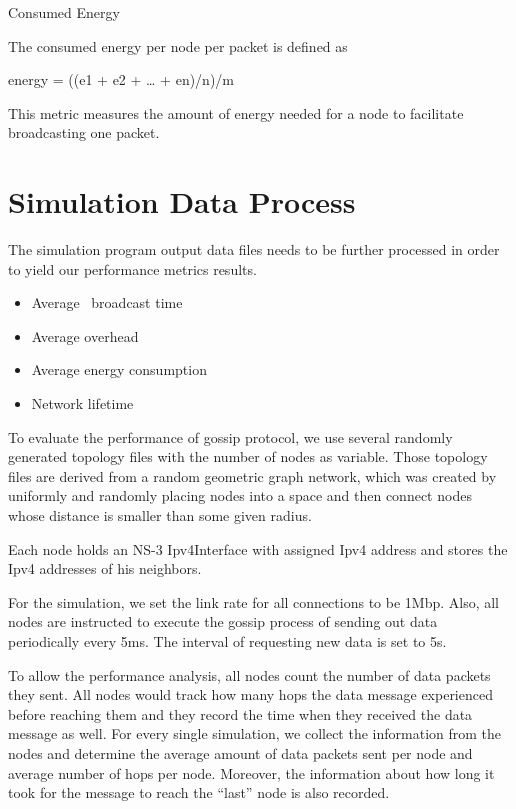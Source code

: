 Consumed Energy

The consumed energy per node per packet is defined as

energy = ((e1 + e2 + … + en)/n)/m

This metric measures the amount of energy needed for a node to facilitate broadcasting one packet. 


\section{Simulation Data Process}
The simulation program output data files needs to be further processed in order to yield our performance metrics results. 

\begin{itemize}
	\item Average \msg ~broadcast time
	\item Average overhead
	\item Average energy consumption
	\item Network lifetime 
\end{itemize}

 

To evaluate the performance of gossip protocol, we use several randomly generated topology files with the number of nodes as variable. Those topology files are derived from a random geometric graph network, which was created by uniformly and randomly placing nodes into a space and then connect nodes whose distance is smaller than some given radius.



Each node holds an NS-3 Ipv4Interface with assigned Ipv4 address and stores the Ipv4 addresses of his neighbors.

For the simulation, we set the link rate for all connections to be 1Mbp. Also, all nodes are instructed to execute the gossip process of sending out data periodically every 5ms. The interval of requesting new data is set to 5s.

To allow the performance analysis, all nodes count the number of data packets they sent. All nodes would track how many hops the data message experienced before reaching them and they record the time when they received the data message as well. For every single simulation, we collect the information from the nodes and determine the average amount of data packets sent per node and average number of hops per node. Moreover, the information about how long it took for the message to reach the ``last'' node is also recorded.

